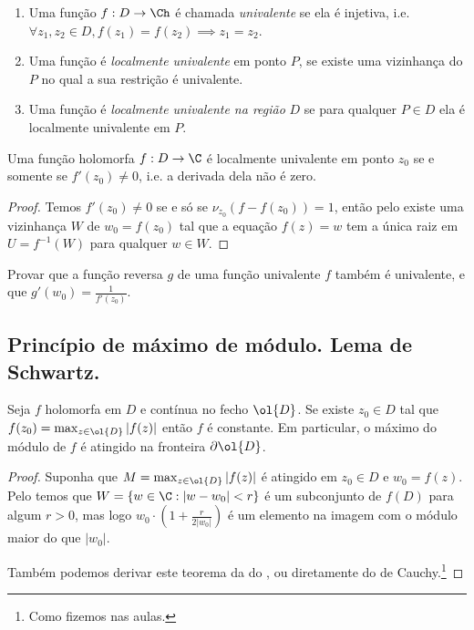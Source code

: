 \begin{defin}
\begin{enumerate}
\item Uma função $f: D\to\Ch$ é chamada \emph{univalente} se ela é injetiva, i.e.
$\forall z_1,z_2\in D, f(z_1) = f(z_2) \implies z_1 = z_2$.
\item Uma função é \emph{localmente univalente} em ponto $P$, se existe uma vizinhança
do $P$ no qual a sua restrição é univalente.
\item Uma função é \emph{localmente univalente na região} $D$ se para qualquer $P\in D$
ela é localmente univalente em $P$.
\end{enumerate}
\end{defin}

\begin{teorema}
\label{t:univalencia}
Uma função holomorfa $f : D\to \C$ é localmente univalente em ponto $z_0$ se e somente se 
$f'(z_0)\neq 0$, i.e. a derivada dela não é zero.
\end{teorema}
\begin{proof}
Temos $f'(z_0)\neq 0$ se e só se $\nu_{z_0}(f-f(z_0)) = 1$,
então pelo  existe uma vizinhança $W$ de $w_0 = f(z_0)$
tal que a equação $f(z) = w$ tem a única raiz em $U = f^{-1}(W)$
para qualquer $w\in W$.
\end{proof}

\begin{problema}
Provar que a função reversa $g$ de uma função univalente $f$ também é univalente,
e que $g'(w_0) = \frac{1}{f'(z_0)}$.
\end{problema}

\subsection{Princípio de máximo de módulo. Lema de Schwartz.}

\begin{teorema}
\label{t:maximo}
Seja $f$ holomorfa em $D$ e contínua no fecho $\ol{D}$.
Se existe $z_0\in D$ tal que $f(z_0) = \max_{z\in\ol{D}} |f(z)|$ então $f$ é constante.
Em particular, o máximo do módulo de $f$ é atingido na fronteira $\partial\ol{D}$.
\end{teorema}
\begin{proof}
Suponha que $M = \max_{z\in\ol{D}} |f(z)|$ é atingido em $z_0\in D$ e $w_0 = f(z)$.
Pelo  temos que $W = \{ w\in\C : |w-w_0|<r \}$
é um subconjunto de $f(D)$ para algum $r>0$, mas logo
$w_0 \cdot (1+\frac{r}{2|w_0|})$ é um elemento na imagem com o módulo maior
do que $|w_0|$.

Também podemos derivar este teorema da  do ,
ou diretamente do  de Cauchy.\footnote{Como fizemos nas aulas.}
\end{proof}


